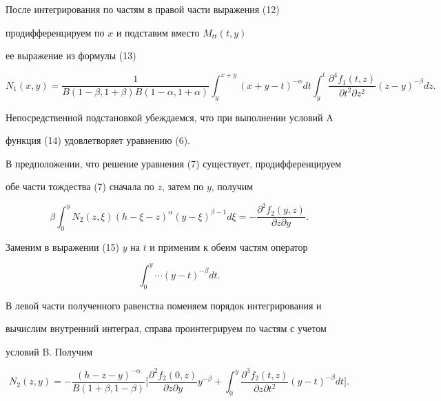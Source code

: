 После интегрирования по частям в правой части выражения (12) 


продифференцируем по $x$ и подставим вместо $M_{tt}(t,y)$ 


ее выражение из формулы (13) 


\begin{equation} 


N_1(x,y)=\frac{1}{B(1-\beta,1+\beta)B(1-\alpha,1+\alpha)} 


\int^{x+y}_y(x+y-t)^{-\alpha}dt 


\int^t_y\frac{\partial^4f_1(t,z)}{\partial t^2\partial z^2} 


(z-y)^{-\beta}dz. 


\end{equation} 


Непосредственной подстановкой убеждаемся, что при выполнении условий A 


функция (14) удовлетворяет уравнению (6). 


 


В предположении, что решение уравнения (7) существует, продифференцируем 


обе части тождества (7) сначала по $z$, затем по $y$, получим 


\begin{equation} 


\beta\int^y_0 N_2(z,\xi)(h-\xi-z)^\alpha(y-\xi)^{\beta-1}d\xi= 


-\frac{\partial^2f_2(y,z)}{\partial z \partial y}. 


\end{equation} 


Заменим в выражении (15) $y$ на $t$ и применим к обеим частям оператор 


$$ 


\int^y_0\dotsb(y-t)^{-\beta}dt. 


$$ 


В левой части полученного равенства поменяем порядок интегрирования и 


вычислим внутренний интеграл, справа проинтегрируем по частям с учетом 


условий B. Получим 


\begin{equation} 


N_2(z,y)=-\frac{(h-z-y)^{-\alpha}}{B(1+\beta,1-\beta)}\bigg[ 


\frac{\partial^2f_2(0,z)}{\partial z\partial y}y^{-\beta}+ 


\int^y_0\frac{\partial^3f_2(t,z)}{\partial z\partial t^2} 


(y-t)^{-\beta}dt\bigg]. 


\end{equation} 


